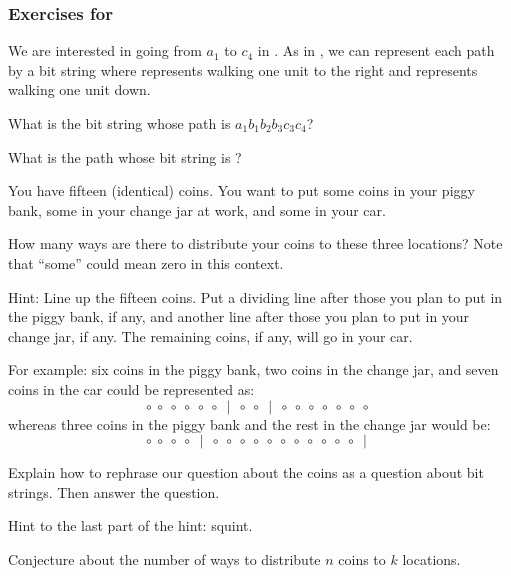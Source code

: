\subsubsection*{Exercises for  \subrephrasingsubset}

\begin{exer}[\exerP] %
\label{exer_froma1toc4}
    We are interested in going from $a_1$ to $c_4$ in .  As in , we can represent each path by a bit string where  represents walking one unit to the right and  represents walking one unit down.  
        \begin{exerpart}
            \item What is the bit string whose path is $a_1b_1b_2b_3c_3c_4$?
            \item What is the path whose bit string is ?           
        \end{exerpart}
\end{exer}

\begin{exer} [\exerU] %
\label{exer_stars_and_bars}
    You have fifteen (identical) coins. You want to put some coins in your piggy bank, some in your change jar at work, and some in your car. 
    \begin{exerpart}
        \item How many ways are there to distribute your coins to these three locations?  Note that ``some'' could mean zero in this context.

        Hint: Line up the fifteen coins.  Put a dividing line after those you plan to put in the piggy bank, if any, and another line after those you plan to put in your change jar, if any. The remaining coins, if any, will go in your car. 
        
        For example:  six coins in the piggy bank, two coins in the change jar, and seven coins in the car could be represented as:
            $$\circ ~ \circ ~ \circ ~ \circ ~ \circ ~ \circ ~ \mid ~ \circ ~ \circ ~ \mid ~ \circ ~ \circ ~ \circ~  \circ ~ \circ ~ \circ ~ \circ ~$$
        whereas three coins in the piggy bank and the rest in the change jar would be:
            $$\circ ~ \circ ~ \circ ~ \circ ~ \mid ~ \circ ~ \circ ~  \circ ~ \circ ~ \circ ~ \circ ~ \circ~  \circ ~ \circ ~ \circ ~ \circ ~ \mid ~ $$
    
      Explain how to rephrase our question about the coins as a question about bit strings. Then answer the question. 
    
      Hint to the last part of the hint: squint.
    \item Conjecture about the number of ways to distribute $n$ coins to $k$ locations.
    \end{exerpart}
\end{exer}

